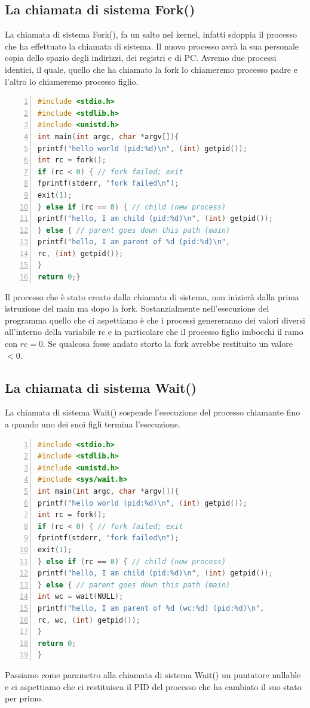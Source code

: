 \documentclass{article}
\begin{document}
\subsection{La chiamata di sistema Fork()}
La chiamata di sistema Fork(), fa un salto nel kernel, infatti sdoppia il processo che ha effettuato la chiamata di sistema. Il nuovo processo avrà la sua personale copia dello spazio degli indirizzi, dei registri e di PC. Avremo due processi identici, il quale, quello che ha chiamato la fork lo chiameremo processo padre e l'altro lo chiameremo processo figlio.
\begin{lstlisting}[language=C, frame=single, numbers=left, caption=p1.c]
#include <stdio.h>
#include <stdlib.h>
#include <unistd.h>
int main(int argc, char *argv[]){
printf("hello world (pid:%d)\n", (int) getpid());
int rc = fork();
if (rc < 0) { // fork failed; exit
fprintf(stderr, "fork failed\n");
exit(1);
} else if (rc == 0) { // child (new process)
printf("hello, I am child (pid:%d)\n", (int) getpid());
} else { // parent goes down this path (main)
printf("hello, I am parent of %d (pid:%d)\n",
rc, (int) getpid());
}
return 0;}
\end{lstlisting}
\noindent
Il processo che è stato creato dalla chiamata di sistema, non inizierà dalla prima istruzione del main ma dopo la fork. Sostanzialmente nell'esecuzione del programma quello che ci aspettiamo è che i processi genereranno dei valori diversi all'interno della variabile rc e in particolare che il processo figlio imbocchi il ramo con $rc=0$. Se qualcosa fosse andato storto la fork avrebbe restituito un valore $<0$.
\subsection{La chiamata di sistema Wait()}
La chiamata di sistema Wait() sospende l'esecuzione del processo chiamante fino a quando uno dei suoi figli termina l'esecuzione.
\begin{lstlisting}[language=C, frame=single, numbers=left, caption=p2.c]
#include <stdio.h>
#include <stdlib.h>
#include <unistd.h>
#include <sys/wait.h>
int main(int argc, char *argv[]){
printf("hello world (pid:%d)\n", (int) getpid());
int rc = fork();
if (rc < 0) { // fork failed; exit
fprintf(stderr, "fork failed\n");
exit(1);
} else if (rc == 0) { // child (new process)
printf("hello, I am child (pid:%d)\n", (int) getpid());
} else { // parent goes down this path (main)
int wc = wait(NULL);
printf("hello, I am parent of %d (wc:%d) (pid:%d)\n",
rc, wc, (int) getpid());
}
return 0;
}
\end{lstlisting}
\noindent
Passiamo come parametro alla chiamata di sistema Wait() un puntatore nullable e ci aspettiamo che ci restituisca il PID del processo che ha cambiato il suo stato per primo.
\end{document}
